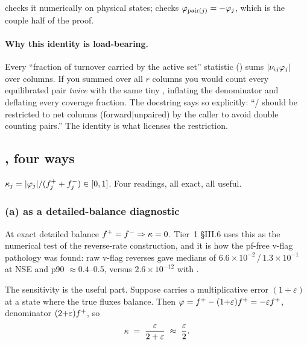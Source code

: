  checks it numerically on physical states;
 checks $\varphi_{\mathrm{pair}(j)} =
-\varphi_j$, which is the couple half of the proof.

\paragraph{Why this identity is load-bearing.} Every ``fraction of turnover
carried by the active set'' statistic
() sums
$|\nu_{ij}\varphi_j|$ over columns. If you summed over all $r$ columns you
would count every equilibrated pair \emph{twice} with the same tiny \netflux,
inflating the denominator and deflating every coverage fraction. The docstring
says so explicitly: ``/ should be restricted to net columns
(forward|unpaired) by the caller to avoid double counting pairs.'' The identity
is what licenses the restriction.

\subsection{\texorpdfstring{\kap}{kappa}, four ways}
\label{sec:kappa}

$\kappa_j = |\varphi_j| / (f^{+}_j + f^{-}_j) \in [0, 1]$. Four readings, all exact,
all useful.

\subsubsection{(a) \texorpdfstring{\kap}{kappa} as a detailed-balance
               diagnostic}
\label{sec:kappa-db}

At exact detailed balance $f^{+} = f^{-} \Rightarrow \kappa = 0$. Tier~1 \S III.6 uses
this as the numerical test of the reverse-rate construction, and it is how the
pf-free v-flag pathology was found: raw v-flag reverses gave \kap{} medians of
$6.6\times10^{-2}$\,/\,$1.3\times10^{-1}$ at NSE and p90 $\approx 0.4$--0.5,
versus $2.6\times10^{-12}$ with .

The sensitivity is the useful part. Suppose \fm{} carries a multiplicative error
$(1 + \varepsilon)$ at a state where the true fluxes balance. Then
$\varphi = f^{+} - (1{+}\varepsilon)f^{+} = -\varepsilon f^{+}$, denominator
$(2{+}\varepsilon)f^{+}$, so
%
\begin{equation}
\kappa \;=\; \frac{\varepsilon}{2+\varepsilon} \;\approx\; \frac{\varepsilon}{2}.
\label{eq:kappaeps}
\end{equation}

